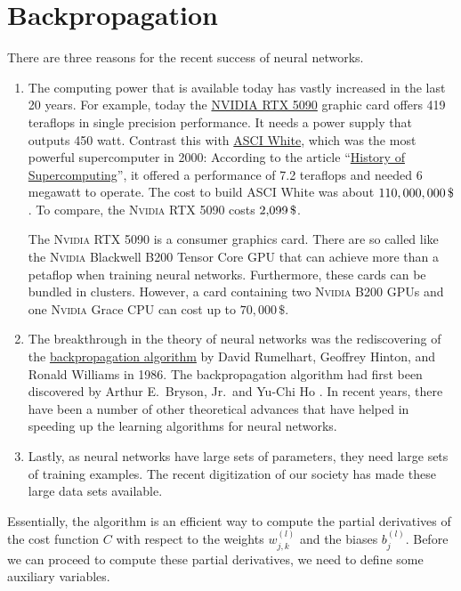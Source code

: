 \section{Backpropagation}
There are three reasons for the recent success of neural networks.
\begin{enumerate}
\item The computing power that is available today has vastly increased in the last 20 years.
      For example, today the
      \href{https://www.nvidia.com/de-de/geforce/graphics-cards/50-series/rtx-5090/}{NVIDIA RTX 5090}
      graphic card offers 419 teraflops in single precision performance. It needs a power supply that
      outputs 450 watt. Contrast this with \href{https://en.wikipedia.org/wiki/ASCI_White}{ASCI White}, which
      was the most powerful supercomputer in 2000: According to the article
      ``\href{https://en.wikipedia.org/wiki/History_of_supercomputing}{History of Supercomputing}'', 
      it  offered a performance of 7.2 teraflops and needed 6 megawatt to operate.  The cost to build ASCI
      White was about $110,000,000\,\symbol{36}$.   To compare, the \textsc{Nvidia} RTX 5090 costs $2,\!099\,\symbol{36}$.

      The \textsc{Nvidia} RTX 5090 is a consumer graphics card.  There are so called 
      like the \textsc{Nvidia} Blackwell B200 Tensor Core GPU that can achieve more than a
      petaflop when training neural networks.  Furthermore, these cards can be bundled
      in clusters.  However, a card containing two \textsc{Nvidia} B200 GPUs and one \textsc{Nvidia} Grace CPU
      can cost up to $70,000\, \$$. 
\item The breakthrough in the theory of neural networks was the rediscovering of the
      \href{https://en.wikipedia.org/wiki/Backpropagation}{backpropagation algorithm}  by
      David Rumelhart, Geoffrey Hinton, and Ronald Williams \cite{rumelhart:1986} in 1986.  
      The backpropagation algorithm had first been discovered by Arthur E.~Bryson, Jr.~and Yu-Chi Ho
      \cite{bryson:1969}.  In recent years, there have been a number of other theoretical advances that have
      helped in speeding up the learning algorithms for neural networks.
\item Lastly, as neural networks have large sets of parameters, they need large sets of training examples.  The
      recent digitization of our society has made these large data sets available.
\end{enumerate}
Essentially, the  algorithm is an efficient way to compute the partial derivatives of the
cost function $C$ with respect to the weights $w_{j,k}^{(l)}$ and the biases $b_j^{(l)}$.  Before we can
proceed to compute these partial derivatives, we need to define some auxiliary variables. 

